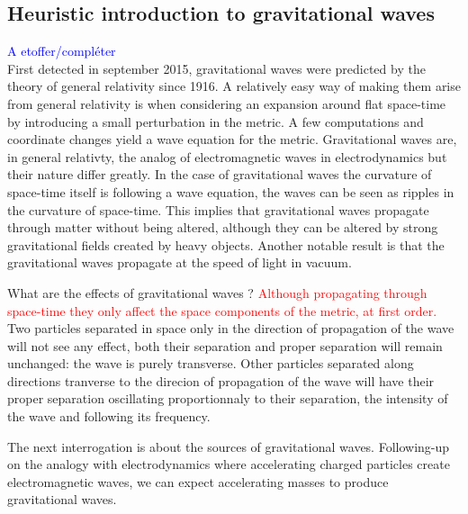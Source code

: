 
\subsection{Heuristic introduction to gravitational waves}
\textcolor{blue}{A etoffer/compléter}
\vspace{1cm}\\
First detected in september 2015, gravitational waves were predicted by the theory of general relativity since 1916.
A relatively easy way of making them arise from general relativity is when considering an expansion around flat space-time by introducing a small perturbation in the metric.
A few computations and coordinate changes yield a wave equation for the metric.
Gravitational waves are, in general relativty, the analog of electromagnetic waves in electrodynamics but their nature differ greatly.
In the case of gravitational waves the curvature of space-time itself is following a wave equation, the waves can be seen as ripples in the curvature of space-time.
This implies that gravitational waves propagate through matter without being altered, although they can be altered by strong gravitational fields created by heavy objects.
Another notable result is that the gravitational waves propagate at the speed of light in vacuum.

What are the effects of gravitational waves ?
\textcolor{red}{Although propagating through space-time they only affect the space components of the metric, at first order.}
Two particles separated in space only in the direction of propagation of the wave will not see any effect, both their separation and proper separation will remain unchanged: the wave is purely transverse.
Other particles separated along directions tranverse to the direcion of propagation of the wave will have their proper separation oscillating proportionnaly to their separation, the intensity of the wave and following its frequency.

The next interrogation is about the sources of gravitational waves.
Following-up on the analogy with electrodynamics where accelerating charged particles create electromagnetic waves, we can expect accelerating masses to produce gravitational waves.


